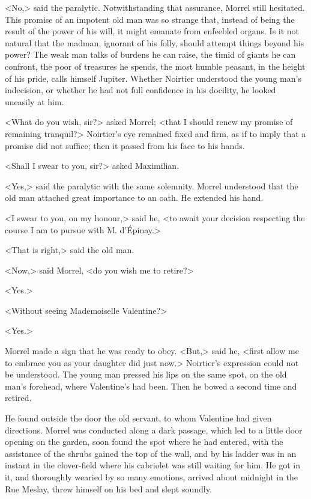  <No,> said the paralytic. Notwithstanding that assurance, Morrel still hesitated. This promise of an impotent old man was so strange that, instead of being the result of the power of his will, it might emanate from enfeebled organs. Is it not natural that the madman, ignorant of his folly, should attempt things beyond his power? The weak man talks of burdens he can raise, the timid of giants he can confront, the poor of treasures he spends, the most humble peasant, in the height of his pride, calls himself Jupiter. Whether Noirtier understood the young man's indecision, or whether he had not full confidence in his docility, he looked uneasily at him. 

 <What do you wish, sir?> asked Morrel; <that I should renew my promise of remaining tranquil?> Noirtier's eye remained fixed and firm, as if to imply that a promise did not suffice; then it passed from his face to his hands. 

 <Shall I swear to you, sir?> asked Maximilian. 

 <Yes,> said the paralytic with the same solemnity. Morrel understood that the old man attached great importance to an oath. He extended his hand. 

 <I swear to you, on my honour,> said he, <to await your decision respecting the course I am to pursue with M. d'Épinay.> 

 <That is right,> said the old man. 

 <Now,> said Morrel, <do you wish me to retire?> 

 <Yes.> 

 <Without seeing Mademoiselle Valentine?> 

 <Yes.> 

 Morrel made a sign that he was ready to obey. <But,> said he, <first allow me to embrace you as your daughter did just now.> Noirtier's expression could not be understood. The young man pressed his lips on the same spot, on the old man's forehead, where Valentine's had been. Then he bowed a second time and retired. 

 He found outside the door the old servant, to whom Valentine had given directions. Morrel was conducted along a dark passage, which led to a little door opening on the garden, soon found the spot where he had entered, with the assistance of the shrubs gained the top of the wall, and by his ladder was in an instant in the clover-field where his cabriolet was still waiting for him. He got in it, and thoroughly wearied by so many emotions, arrived about midnight in the Rue Meslay, threw himself on his bed and slept soundly. 